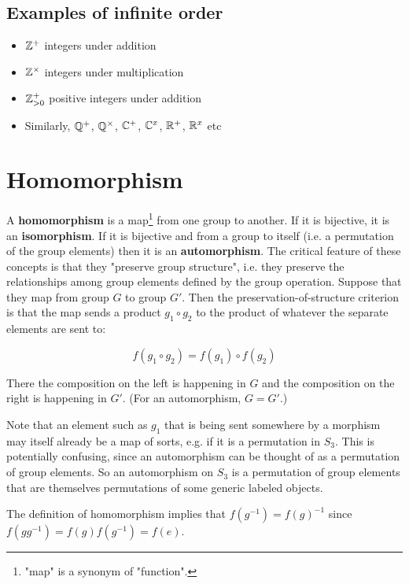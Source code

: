\subsection{Examples of infinite order}

\begin{itemize}
\item $\mathbb{Z}^+$ integers under addition

\item $\mathbb{Z}^\times$ integers under multiplication

\item $\mathbb{Z}_{>0}^+$ positive integers under addition

\item Similarly, $\mathbb{Q}^+$, $\mathbb{Q}^\times$, $\mathbb{C}^+$, $\mathbb{C}^x$, $\mathbb{R}^+$, $\mathbb{R}^x$ etc

\end{itemize}

\section{Homomorphism}
A \textbf{homomorphism} is a map\footnote{"map" is a synonym of "function".} from
one group to another. If it is bijective, it is an \textbf{isomorphism}. If it is
bijective and from a group to itself (i.e. a permutation of the group elements)
then it is an \textbf{automorphism}. The critical feature of these concepts is that
they "preserve group structure", i.e. they preserve the relationships among
group elements defined by the group operation. Suppose that they map from group
$G$ to group $G'$. Then the preservation-of-structure criterion is that the map
sends a product $g_1 \circ g_2$ to the product of whatever the separate
elements are sent to:

$$
f(g_1 \circ g_2) = f(g_1) \circ f(g_2)
$$

There the composition on the left is happening in $G$ and the composition on
the right is happening in $G'$. (For an automorphism, $G=G'$.)

Note that an element such as $g_1$ that is being sent somewhere by a morphism
may itself already be a map of sorts, e.g. if it is a permutation in
$S_3$. This is potentially confusing, since an automorphism can be thought of
as a permutation of group elements. So an automorphism on $S_3$ is a
permutation of group elements that are themselves permutations of some generic
labeled objects.

The definition of homomorphism implies that $f(g^{-1}) = f(g)^{-1}$ since
$f(gg^{-1}) = f(g)f(g^{-1}) = f(e)$.

